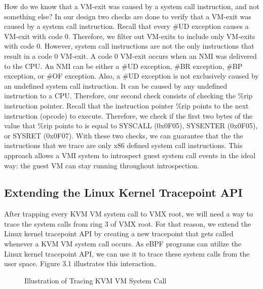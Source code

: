 \documentclass{report}
\begin{document}
\begin{spacing}{1.5}
{\large
How do we know that a VM-exit was caused by a system call instruction, and not something else? In our design two checks are done to verify that a VM-exit was caused by a system call instruction. Recall that every \#UD exception causes a VM-exit with code 0. Therefore, we filter out VM-exits to include only VM-exits with code 0. However, system call instructions are not the only instructions that result in a code 0 VM-exit. A code 0 VM-exit occurs when an NMI was delivered to the CPU. An NMI can be either a \#UD exception, \#BR exception, \#BP exception, or \#OF exception. Also, a \#UD exception is not exclusively caused by an undefined system call instruction. It can be caused by any undefined instruction to a CPU. Therefore, our second check consists of checking the \%rip instruction pointer. Recall that the instruction pointer \%rip points to the next instruction (opcode) to execute. Therefore, we check if the first two bytes of the value that \%rip points to is equal to SYSCALL (0x0F05), SYSENTER (0x0F05), or SYSRET (0x0F07). With these two checks, we can guarantee that the the instructions that we trace are only x86 defined system call instructions. This approach allows a VMI system to introspect guest system call events in the ideal way: the guest VM can stay running throughout introspection.
\leavevmode\newline
}


\subsection{Extending the Linux Kernel Tracepoint API}
{\large
After trapping every KVM VM system call to VMX root, we  will need a way to trace the system calls from ring 3 of VMX root. For that reason, we extend the Linux kernel tracepoint API by creating a new tracepoint that gets called whenever a KVM VM system call occurs. As eBPF programs can utilize the Linux kernel tracepoint API, we can use it to trace these system calls from the user space. Figure 3.1 illustrates this interaction.
\leavevmode\newline
}











\newpage
\vfill
{}
\begin{figure}[ht]
\centering
  \caption{Illustration of Tracing KVM VM System Call}
\end{figure}















\end{spacing}
\end{document}
